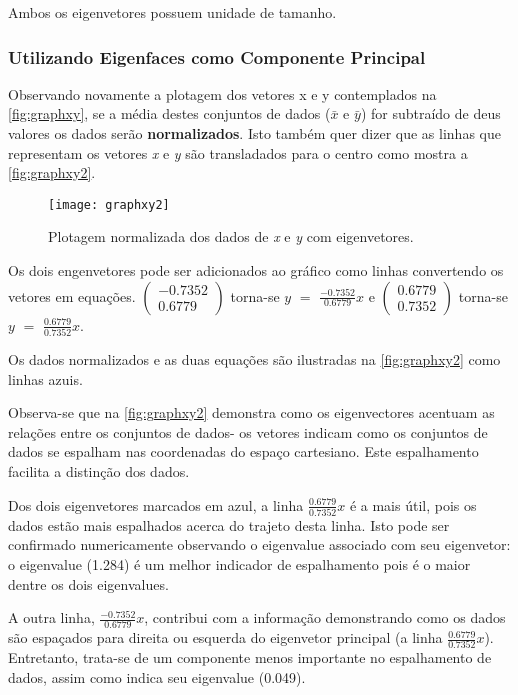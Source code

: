 Ambos os eigenvetores possuem unidade de tamanho.

\subsubsection{Utilizando Eigenfaces como Componente Principal}\label{subsec:eigenacp}

Observando novamente a plotagem dos vetores x e y contemplados na \autoref{fig:graphxy}, se a média destes conjuntos de dados ($\bar{x}$ e $\bar{y}$) for subtraído de deus valores os dados serão \textbf{normalizados}. Isto também quer dizer que as linhas que representam os vetores \textit{x} e \textit{y} são transladados para o centro como mostra a \autoref{fig:graphxy2}. 

\begin{figure}[h]
	\centering
	\texttt{[image: graphxy2]}
	\caption{Plotagem normalizada dos dados de \textit{x} e \textit{y} com eigenvetores.}
	\label{fig:graphxy2}
\end{figure}

Os dois engenvetores pode ser adicionados ao gráfico como linhas convertendo os vetores em equações. 
$\begin{pmatrix} -0.7352 \\ 0.6779 \end{pmatrix}$ torna-se $y$ $=$ $\frac{-0.7352}{0.6779}$$x$  e $\begin{pmatrix} 0.6779 \\ 0.7352 \end{pmatrix}$ torna-se $y$ $=$ $\frac{0.6779}{0.7352}$$x$.

Os dados normalizados e as duas equações são ilustradas na \autoref{fig:graphxy2} como linhas azuis. 

Observa-se que na \autoref{fig:graphxy2} demonstra como os eigenvectores acentuam as relações entre os conjuntos de dados- os vetores indicam como os conjuntos de dados se espalham nas coordenadas do espaço cartesiano. Este espalhamento facilita a distinção dos dados.

Dos dois eigenvetores marcados em azul, a linha $\frac{0.6779}{0.7352}$$x$ é a mais útil, pois os dados estão mais espalhados acerca do trajeto desta linha. Isto pode ser confirmado numericamente observando o eigenvalue associado com seu eigenvetor: o eigenvalue (1.284) é um melhor indicador de espalhamento pois é o maior dentre os dois eigenvalues.

A outra linha, $\frac{-0.7352}{0.6779}$$x$, contribui com a informação demonstrando como os dados são espaçados para direita ou esquerda do eigenvetor principal (a linha $\frac{0.6779}{0.7352}$$x$). Entretanto, trata-se de um componente menos importante no espalhamento de dados, assim como indica seu eigenvalue (0.049).

